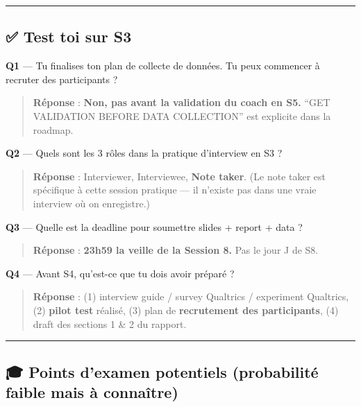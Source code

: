 \documentclass[
]{article}
\begin{document}
\begin{center}\rule{0.5\linewidth}{0.5pt}\end{center}

\subsection{✅ Test toi sur S3}\label{test-toi-sur-s3}

\textbf{Q1} --- Tu finalises ton plan de collecte de données. Tu peux
commencer à recruter des participants ?

\begin{quote}
\textbf{Réponse} : \textbf{Non, pas avant la validation du coach en S5.}
``GET VALIDATION BEFORE DATA COLLECTION'' est explicite dans la roadmap.
\end{quote}

\textbf{Q2} --- Quels sont les 3 rôles dans la pratique d'interview en
S3 ?

\begin{quote}
\textbf{Réponse} : Interviewer, Interviewee, \textbf{Note taker}. (Le
note taker est spécifique à cette session pratique --- il n'existe pas
dans une vraie interview où on enregistre.)
\end{quote}

\textbf{Q3} --- Quelle est la deadline pour soumettre slides + report +
data ?

\begin{quote}
\textbf{Réponse} : \textbf{23h59 la veille de la Session 8.} Pas le jour
J de S8.
\end{quote}

\textbf{Q4} --- Avant S4, qu'est-ce que tu dois avoir préparé ?

\begin{quote}
\textbf{Réponse} : (1) interview guide / survey Qualtrics / experiment
Qualtrics, (2) \textbf{pilot test} réalisé, (3) plan de
\textbf{recrutement des participants}, (4) draft des sections 1 \& 2 du
rapport.
\end{quote}

\begin{center}\rule{0.5\linewidth}{0.5pt}\end{center}

\subsection{🎓 Points d'examen potentiels (probabilité faible mais à
connaître)}\label{points-dexamen-potentiels-probabilituxe9-faible-mais-uxe0-connauxeetre}
\end{document}
